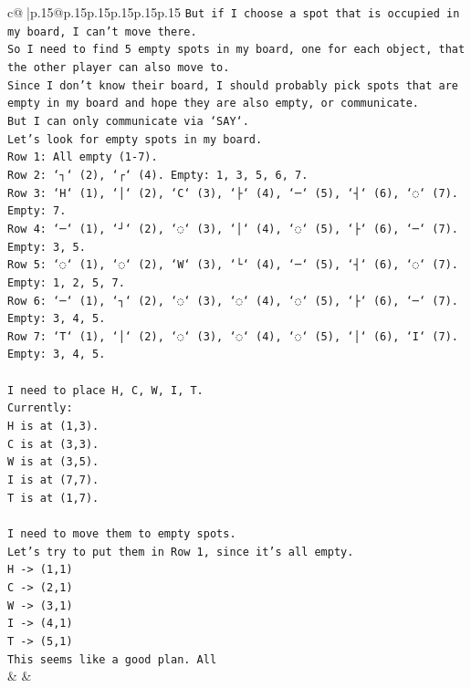 \documentclass{article}
\begin{document}
{\begin{supertabular}{c@{$\;$}|p{.15\linewidth}@{}p{.15\linewidth}p{.15\linewidth}p{.15\linewidth}p{.15\linewidth}p{.15\linewidth}}
{{{\texttt{But if I choose a spot that is occupied in my board, I can't move there.} \\
\texttt{So I need to find 5 empty spots in my board, one for each object, that the other player can also move to.} \\
\texttt{Since I don't know their board, I should probably pick spots that are empty in my board and hope they are also empty, or communicate.} \\
\texttt{But I can only communicate via `SAY`.} \\
\texttt{Let's look for empty spots in my board.} \\
\texttt{Row 1: All empty (1{-}7).} \\
\texttt{Row 2: `┐` (2), `┌` (4). Empty: 1, 3, 5, 6, 7.} \\
\texttt{Row 3: `H` (1), `│` (2), `C` (3), `├` (4), `─` (5), `┤` (6), `◌` (7). Empty: 7.} \\
\texttt{Row 4: `─` (1), `┘` (2), `◌` (3), `│` (4), `◌` (5), `├` (6), `─` (7). Empty: 3, 5.} \\
\texttt{Row 5: `◌` (1), `◌` (2), `W` (3), `└` (4), `─` (5), `┤` (6), `◌` (7). Empty: 1, 2, 5, 7.} \\
\texttt{Row 6: `─` (1), `┐` (2), `◌` (3), `◌` (4), `◌` (5), `├` (6), `─` (7). Empty: 3, 4, 5.} \\
\texttt{Row 7: `T` (1), `│` (2), `◌` (3), `◌` (4), `◌` (5), `│` (6), `I` (7). Empty: 3, 4, 5.} \\
\\ 
\texttt{I need to place H, C, W, I, T.} \\
\texttt{Currently:} \\
\texttt{H is at (1,3).} \\
\texttt{C is at (3,3).} \\
\texttt{W is at (3,5).} \\
\texttt{I is at (7,7).} \\
\texttt{T is at (1,7).} \\
\\ 
\texttt{I need to move them to empty spots.} \\
\texttt{Let's try to put them in Row 1, since it's all empty.} \\
\texttt{H {-}> (1,1)} \\
\texttt{C {-}> (2,1)} \\
\texttt{W {-}> (3,1)} \\
\texttt{I {-}> (4,1)} \\
\texttt{T {-}> (5,1)} \\
\texttt{This seems like a good plan. All} \\
            }
        }
    }
    & & \\ \\


\end{supertabular}}
\end{document}
